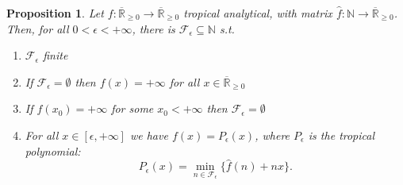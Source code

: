 \documentclass[submission,copyright,creativecommons]{eptcs}
\newtheorem{Proposition}[theorem]{Proposition}
\newcommand{\N}{\mathbb{N}}
\newcommand{\R}{\mathbb{R}}
\newcommand{\set}[1]{\{#1\}}
\begin{document}
\begin{Proposition}
Let $f:\overline{\R}_{\geq 0} \to \overline{\R}_{\geq 0}$ tropical analytical, with matrix $\hat f : \N \to \overline{\R}_{\geq 0}$.
Then, for all $0<\epsilon<+\infty$, there is $\mathcal{F}_\epsilon\subseteq\N$ s.t.\
\begin{enumerate}
 \item $\mathcal{F}_\epsilon$ finite
 \item If $\mathcal{F}_\epsilon= \emptyset$ then $f(x) = +\infty$ for all $x\in \overline{\R}_{\geq 0}$
 \item If $f(x_0) = +\infty$ for some $x_0<+\infty$ then $\mathcal{F}_\epsilon= \emptyset$
 \item For all $x\in [\epsilon,+\infty]$ we have $f(x)=P_\epsilon(x)$, where $P_\epsilon$ is the \emph{tropical polynomial}:
      \[
        P_\epsilon(x)= \min\limits_{n\in\mathcal{F}_\epsilon} \set{\hat f (n) + nx}.
      \]
\end{enumerate}
\end{Proposition}
\end{document}
